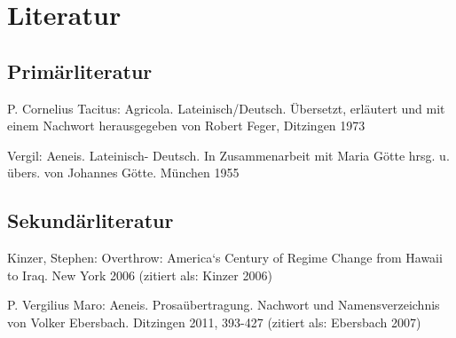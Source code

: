 \documentclass[12pt]{article}
\begin{document}
\newpage
\thispagestyle{empty}	
\section*{Literatur}
\subsection*{Primärliteratur}
P. Cornelius Tacitus: Agricola. Lateinisch/Deutsch. Übersetzt, erläutert und mit einem
Nachwort herausgegeben von Robert Feger, Ditzingen 1973

\noindent
Vergil: Aeneis. Lateinisch- Deutsch. In Zusammenarbeit mit Maria Götte hrsg. u.
übers. von Johannes Götte. München 1955
\subsection*{Sekundärliteratur}
Kinzer, Stephen: Overthrow: America‘s Century of Regime Change from Hawaii to
Iraq. New York 2006 (zitiert als: Kinzer 2006)

\noindent
P. Vergilius Maro: Aeneis. Prosaübertragung. Nachwort und Namensverzeichnis von
Volker Ebersbach. Ditzingen 2011, 393-427 (zitiert als: Ebersbach 2007)
\end{document}
